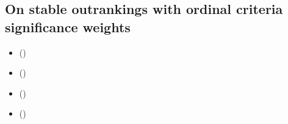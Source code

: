 \documentclass[a4paper,12pt,english]{sphinxhowto}
\begin{document}
\subsection{On stable outrankings with ordinal criteria significance weights}
\label{\detokenize{pearls:on-stable-outrankings-with-ordinal-criteria-significance-weights}}\label{\detokenize{pearls:stable-outranking-tutorial-label}}
\begin{sphinxcontents}
\begin{itemize}
\item {} 
\sphinxAtStartPar
{}\label{\detokenize{pearls:id113}}{\hyperref[\detokenize{pearls:cardinal-or-ordinal-criteria-significance-weights}]{}} ()

\item {} 
\sphinxAtStartPar
{}\label{\detokenize{pearls:id114}}{\hyperref[\detokenize{pearls:qualifying-the-stability-of-outranking-situations}]{}} ()

\item {} 
\sphinxAtStartPar
{}\label{\detokenize{pearls:id115}}{\hyperref[\detokenize{pearls:computing-the-stability-denotation-of-outranking-situations}]{}} ()

\item {} 
\sphinxAtStartPar
{}\label{\detokenize{pearls:id116}}{\hyperref[\detokenize{pearls:robust-bipolar-valued-outranking-digraphs}]{}} ()

\end{itemize}
\end{sphinxcontents}
\end{document}

